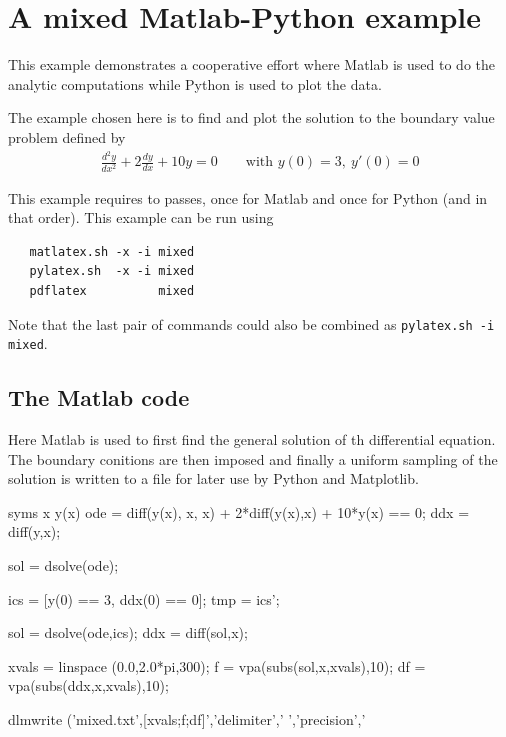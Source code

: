 \documentclass[12pt]{article}
\begin{document}
\section*{A mixed Matlab-Python example}

This example demonstrates a cooperative effort where Matlab is used to do the analytic computations while Python is used to plot the data.

The example chosen here is to find and plot the solution to the boundary value problem defined by
\begin{align*}
   \frac{d^2y}{dx^2} + 2 \frac{dy}{dx} +10 y = 0\quad\quad\text{with }y(0)=3,\> y'(0)=0
\end{align*}

This example requires to passes, once for Matlab and once for Python (and in that order). This example can be run using

\begin{lstlisting}
   matlatex.sh -x -i mixed
   pylatex.sh  -x -i mixed
   pdflatex          mixed
\end{lstlisting}

Note that the last pair of commands could also be combined as {\small\tt pylatex.sh -i mixed}.

\subsection*{The Matlab code}

Here Matlab is used to first find the general solution of th differential equation. The boundary conitions are then imposed and finally a uniform sampling of the solution is written to a file for later use by Python and Matplotlib.

\begin{matlab}
   syms x y(x)
   ode = diff(y(x), x, x) + 2*diff(y(x),x) + 10*y(x) == 0;  %
   ddx = diff(y,x);

   sol = dsolve(ode);                     %

   ics = [y(0) == 3, ddx(0) == 0];
   tmp = ics';                            %

   sol = dsolve(ode,ics);                 %
   ddx = diff(sol,x);                     %

   xvals = linspace (0.0,2.0*pi,300);
    f = vpa(subs(sol,x,xvals),10);
   df = vpa(subs(ddx,x,xvals),10);

   dlmwrite ('mixed.txt',[xvals;f;df]','delimiter',' ','precision','%

\end{matlab}
\end{document}
